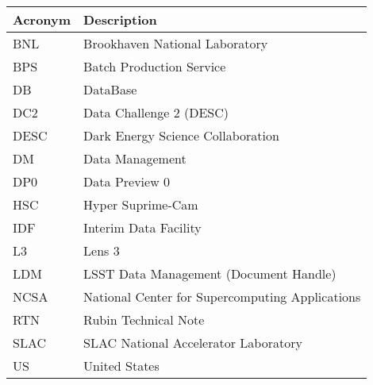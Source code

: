 \addtocounter{table}{-1}
\begin{longtable}{p{}p{}}\hline
\textbf{Acronym} & \textbf{Description}  \\\hline

BNL & Brookhaven National Laboratory \\\hline
BPS & Batch Production Service \\\hline
DB & DataBase \\\hline
DC2 & Data Challenge 2 (DESC) \\\hline
DESC & Dark Energy Science Collaboration \\\hline
DM & Data Management \\\hline
DP0 & Data Preview 0 \\\hline
HSC & Hyper Suprime-Cam \\\hline
IDF & Interim Data Facility \\\hline
L3 & Lens 3 \\\hline
LDM & LSST Data Management (Document Handle) \\\hline
NCSA & National Center for Supercomputing Applications \\\hline
RTN & Rubin Technical Note \\\hline
SLAC & SLAC National Accelerator Laboratory \\\hline
US & United States \\\hline
\end{longtable}
